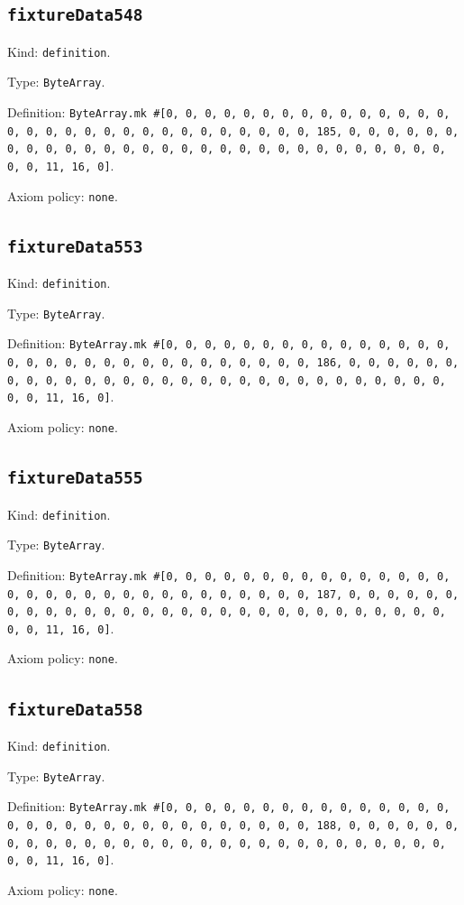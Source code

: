 \documentclass[11pt]{article}
\begin{document}
\subsection*{\texttt{fixtureData548}}
\noindent Kind: \texttt{definition}.\par
\noindent Type: \texttt{ByteArray}.\par
\noindent Definition: \texttt{ByteArray.mk \#[0, 0, 0, 0, 0, 0, 0, 0, 0, 0, 0, 0, 0, 0, 0, 0, 0, 0, 0, 0, 0, 0, 0, 0, 0, 0, 0, 0, 0, 0, 0, 185, 0, 0, 0, 0, 0, 0, 0, 0, 0, 0, 0, 0, 0, 0, 0, 0, 0, 0, 0, 0, 0, 0, 0, 0, 0, 0, 0, 0, 0, 0, 0, 11, 16, 0]}.\par
\noindent Axiom policy: \texttt{none}.\par
\subsection*{\texttt{fixtureData553}}
\noindent Kind: \texttt{definition}.\par
\noindent Type: \texttt{ByteArray}.\par
\noindent Definition: \texttt{ByteArray.mk \#[0, 0, 0, 0, 0, 0, 0, 0, 0, 0, 0, 0, 0, 0, 0, 0, 0, 0, 0, 0, 0, 0, 0, 0, 0, 0, 0, 0, 0, 0, 0, 186, 0, 0, 0, 0, 0, 0, 0, 0, 0, 0, 0, 0, 0, 0, 0, 0, 0, 0, 0, 0, 0, 0, 0, 0, 0, 0, 0, 0, 0, 0, 0, 11, 16, 0]}.\par
\noindent Axiom policy: \texttt{none}.\par
\subsection*{\texttt{fixtureData555}}
\noindent Kind: \texttt{definition}.\par
\noindent Type: \texttt{ByteArray}.\par
\noindent Definition: \texttt{ByteArray.mk \#[0, 0, 0, 0, 0, 0, 0, 0, 0, 0, 0, 0, 0, 0, 0, 0, 0, 0, 0, 0, 0, 0, 0, 0, 0, 0, 0, 0, 0, 0, 0, 187, 0, 0, 0, 0, 0, 0, 0, 0, 0, 0, 0, 0, 0, 0, 0, 0, 0, 0, 0, 0, 0, 0, 0, 0, 0, 0, 0, 0, 0, 0, 0, 11, 16, 0]}.\par
\noindent Axiom policy: \texttt{none}.\par
\subsection*{\texttt{fixtureData558}}
\noindent Kind: \texttt{definition}.\par
\noindent Type: \texttt{ByteArray}.\par
\noindent Definition: \texttt{ByteArray.mk \#[0, 0, 0, 0, 0, 0, 0, 0, 0, 0, 0, 0, 0, 0, 0, 0, 0, 0, 0, 0, 0, 0, 0, 0, 0, 0, 0, 0, 0, 0, 0, 188, 0, 0, 0, 0, 0, 0, 0, 0, 0, 0, 0, 0, 0, 0, 0, 0, 0, 0, 0, 0, 0, 0, 0, 0, 0, 0, 0, 0, 0, 0, 0, 11, 16, 0]}.\par
\noindent Axiom policy: \texttt{none}.\par
\end{document}
